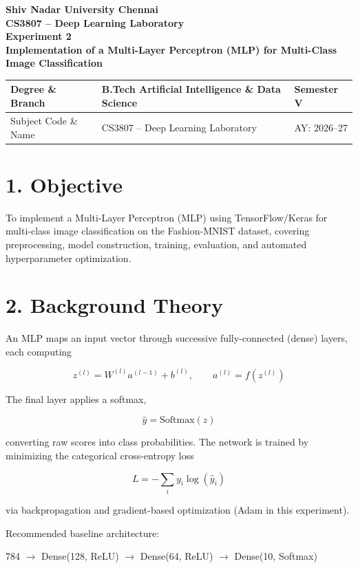 \documentclass[11pt]{article}
\begin{document}
\begin{center}
{\Large\textbf{Shiv Nadar University Chennai}}\\
\textbf{CS3807 -- Deep Learning Laboratory}\\
\textbf{Experiment 2}\\
{\large\textbf{Implementation of a Multi-Layer Perceptron (MLP) for Multi-Class Image Classification}}
\end{center}

\renewcommand{\arraystretch}{1.25}

\begin{tabular}{|p{3.8cm}|p{8cm}|p{2cm}|}
\hline
Degree \& Branch & B.Tech Artificial Intelligence \& Data Science & Semester V\\ \hline
Subject Code \& Name & CS3807 -- Deep Learning Laboratory & AY: 2026--27\\ \hline
\end{tabular}

\section*{1. Objective}
To implement a Multi-Layer Perceptron (MLP) using TensorFlow/Keras for multi-class image classification on the Fashion-MNIST dataset, covering preprocessing, model construction, training, evaluation, and automated hyperparameter optimization.

\section*{2. Background Theory}
An MLP maps an input vector through successive fully-connected (dense) layers, each computing

\[
z^{(l)}=W^{(l)}a^{(l-1)}+b^{(l)},\qquad
a^{(l)}=f(z^{(l)})
\]

The final layer applies a softmax,

\[
\hat y=\mathrm{Softmax}(z)
\]

converting raw scores into class probabilities. The network is trained by minimizing the categorical cross-entropy loss

\[
L=-\sum_i y_i\log(\hat y_i)
\]

via backpropagation and gradient-based optimization (Adam in this experiment).

Recommended baseline architecture:

\begin{center}
784 $\rightarrow$ Dense(128, ReLU) $\rightarrow$ Dense(64, ReLU) $\rightarrow$ Dense(10, Softmax)
\end{center}
\end{document}
